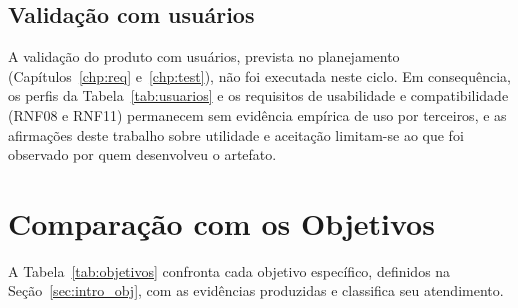 \subsection{Validação com usuários}
\label{sec:test_usuarios}

A validação do produto com usuários, prevista no planejamento (Capítulos~\ref{chp:req} e~\ref{chp:test}), não foi executada neste ciclo. Em consequência, os perfis da Tabela~\ref{tab:usuarios} e os requisitos de usabilidade e compatibilidade (RNF08 e RNF11) permanecem sem evidência empírica de uso por terceiros, e as afirmações deste trabalho sobre utilidade e aceitação limitam-se ao que foi observado por quem desenvolveu o artefato. 

\section{Comparação com os Objetivos}
\label{sec:res_comparacao}

A Tabela~\ref{tab:objetivos} confronta cada objetivo específico, definidos na Seção~\ref{sec:intro_obj}, com as evidências produzidas e classifica seu atendimento.

